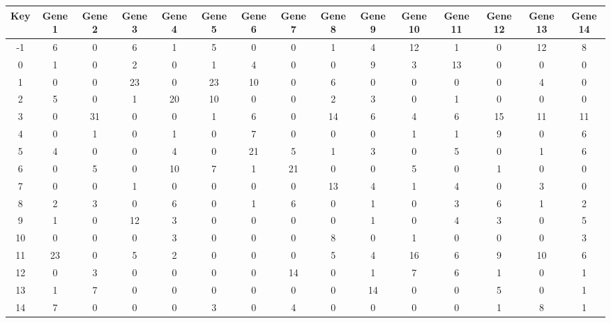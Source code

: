 \begin{tabular}{|c|c|c|c|c|c|c|c|c|c|c|c|c|c|c|}
\hline
Key & Gene 1 & Gene 2 & Gene 3 & Gene 4 & Gene 5 & Gene 6 & Gene 7 & Gene 8 & Gene 9 & Gene 10 & Gene 11 & Gene 12 & Gene 13 & Gene 14 \\
\hline
-1 & 6 & 0 & 6 & 1 & 5 & 0 & 0 & 1 & 4 & 12 & 1 & 0 & 12 & 8 \\
0 & 1 & 0 & 2 & 0 & 1 & 4 & 0 & 0 & 9 & 3 & 13 & 0 & 0 & 0 \\
1 & 0 & 0 & 23 & 0 & 23 & 10 & 0 & 6 & 0 & 0 & 0 & 0 & 4 & 0 \\
2 & 5 & 0 & 1 & 20 & 10 & 0 & 0 & 2 & 3 & 0 & 1 & 0 & 0 & 0 \\
3 & 0 & 31 & 0 & 0 & 1 & 6 & 0 & 14 & 6 & 4 & 6 & 15 & 11 & 11 \\
4 & 0 & 1 & 0 & 1 & 0 & 7 & 0 & 0 & 0 & 1 & 1 & 9 & 0 & 6 \\
5 & 4 & 0 & 0 & 4 & 0 & 21 & 5 & 1 & 3 & 0 & 5 & 0 & 1 & 6 \\
6 & 0 & 5 & 0 & 10 & 7 & 1 & 21 & 0 & 0 & 5 & 0 & 1 & 0 & 0 \\
7 & 0 & 0 & 1 & 0 & 0 & 0 & 0 & 13 & 4 & 1 & 4 & 0 & 3 & 0 \\
8 & 2 & 3 & 0 & 6 & 0 & 1 & 6 & 0 & 1 & 0 & 3 & 6 & 1 & 2 \\
9 & 1 & 0 & 12 & 3 & 0 & 0 & 0 & 0 & 1 & 0 & 4 & 3 & 0 & 5 \\
10 & 0 & 0 & 0 & 3 & 0 & 0 & 0 & 8 & 0 & 1 & 0 & 0 & 0 & 3 \\
11 & 23 & 0 & 5 & 2 & 0 & 0 & 0 & 5 & 4 & 16 & 6 & 9 & 10 & 6 \\
12 & 0 & 3 & 0 & 0 & 0 & 0 & 14 & 0 & 1 & 7 & 6 & 1 & 0 & 1 \\
13 & 1 & 7 & 0 & 0 & 0 & 0 & 0 & 0 & 14 & 0 & 0 & 5 & 0 & 1 \\
14 & 7 & 0 & 0 & 0 & 3 & 0 & 4 & 0 & 0 & 0 & 0 & 1 & 8 & 1 \\
\hline
\end{tabular}